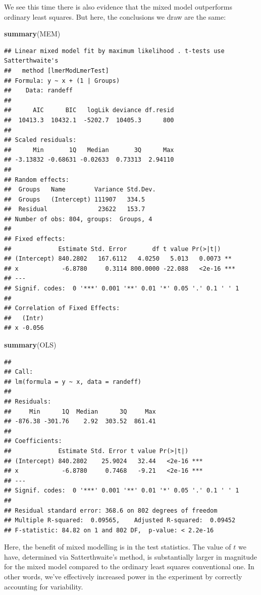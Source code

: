 \documentclass[]{book}
\newenvironment{Shaded}{\begin{snugshade}}{\end{snugshade}}
\newcommand{\KeywordTok}[1]{\textcolor[rgb]{0.13,0.29,0.53}{\textbf{#1}}}
\newcommand{\NormalTok}[1]{#1}
\begin{document}
We see this time there is also evidence that the mixed model outperforms ordinary least squares. But here, the conclusions we draw are the same:

\begin{Shaded}
\begin{Highlighting}[]
\KeywordTok{summary}\NormalTok{(MEM)}
\end{Highlighting}
\end{Shaded}

\begin{verbatim}
## Linear mixed model fit by maximum likelihood . t-tests use Satterthwaite's
##   method [lmerModLmerTest]
## Formula: y ~ x + (1 | Groups)
##    Data: randeff
## 
##      AIC      BIC   logLik deviance df.resid 
##  10413.3  10432.1  -5202.7  10405.3      800 
## 
## Scaled residuals: 
##      Min       1Q   Median       3Q      Max 
## -3.13832 -0.68631 -0.02633  0.73313  2.94110 
## 
## Random effects:
##  Groups   Name        Variance Std.Dev.
##  Groups   (Intercept) 111907   334.5   
##  Residual              23622   153.7   
## Number of obs: 804, groups:  Groups, 4
## 
## Fixed effects:
##             Estimate Std. Error       df t value Pr(>|t|)    
## (Intercept) 840.2802   167.6112   4.0250   5.013   0.0073 ** 
## x            -6.8780     0.3114 800.0000 -22.088   <2e-16 ***
## ---
## Signif. codes:  0 '***' 0.001 '**' 0.01 '*' 0.05 '.' 0.1 ' ' 1
## 
## Correlation of Fixed Effects:
##   (Intr)
## x -0.056
\end{verbatim}

\begin{Shaded}
\begin{Highlighting}[]
\KeywordTok{summary}\NormalTok{(OLS)}
\end{Highlighting}
\end{Shaded}

\begin{verbatim}
## 
## Call:
## lm(formula = y ~ x, data = randeff)
## 
## Residuals:
##     Min      1Q  Median      3Q     Max 
## -876.38 -301.76    2.92  303.52  861.41 
## 
## Coefficients:
##             Estimate Std. Error t value Pr(>|t|)    
## (Intercept) 840.2802    25.9024   32.44   <2e-16 ***
## x            -6.8780     0.7468   -9.21   <2e-16 ***
## ---
## Signif. codes:  0 '***' 0.001 '**' 0.01 '*' 0.05 '.' 0.1 ' ' 1
## 
## Residual standard error: 368.6 on 802 degrees of freedom
## Multiple R-squared:  0.09565,	Adjusted R-squared:  0.09452 
## F-statistic: 84.82 on 1 and 802 DF,  p-value: < 2.2e-16
\end{verbatim}

Here, the benefit of mixed modelling is in the test statistics. The value of \(t\) we have, determined via Satterthwaite's method, is substantially larger in magnitude for the mixed model compared to the ordinary least squares conventional one. In other words, we've effectively increased power in the experiment by correctly accounting for variability.


\end{document}
